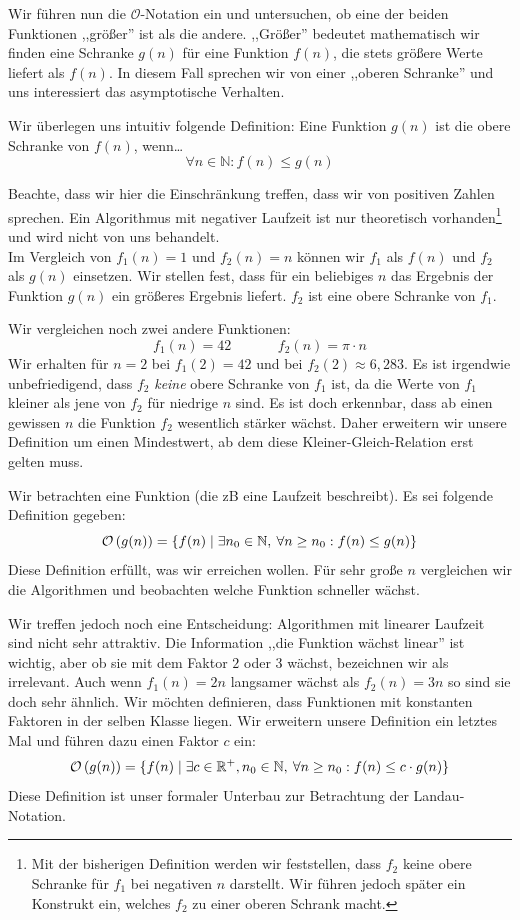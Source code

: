 Wir führen nun die $\mathcal{O}$-Notation ein und untersuchen, ob eine der beiden Funktionen ,,größer'' ist als die andere. ,,Größer'' bedeutet mathematisch wir finden eine Schranke $g(n)$ für eine Funktion $f(n)$, die stets größere Werte liefert als $f(n)$. In diesem Fall sprechen wir von einer ,,oberen Schranke'' und uns interessiert das asymptotische Verhalten.

Wir überlegen uns intuitiv folgende Definition: Eine Funktion $g(n)$ ist die obere Schranke von $f(n)$, wenn\dots
\[
  \forall n \in \mathbb{N}: f(n) \leq g(n)
\]

Beachte, dass wir hier die Einschränkung treffen, dass wir von positiven Zahlen sprechen. Ein Algorithmus mit negativer Laufzeit ist nur theoretisch vorhanden\footnote{Mit der bisherigen Definition werden wir feststellen, dass $f_2$ keine obere Schranke für $f_1$ bei negativen $n$ darstellt. Wir führen jedoch später ein Konstrukt ein, welches $f_2$ zu einer oberen Schrank macht.} und wird nicht von uns behandelt. \\
Im Vergleich von $f_1(n) = 1$ und $f_2(n) = n$ können wir $f_1$ als $f(n)$ und $f_2$ als $g(n)$ einsetzen. Wir stellen fest, dass für ein beliebiges $n$ das Ergebnis der Funktion $g(n)$ ein größeres Ergebnis liefert. $f_2$ ist eine obere Schranke von $f_1$.

Wir vergleichen noch zwei andere Funktionen:
\[
   f_1(n) = 42   \hspace{40pt}  f_2(n) = \pi \cdot n
\]
Wir erhalten für $n = 2$ bei $f_1(2) = 42$ und bei $f_2(2) \approx 6,283$. Es ist irgendwie unbefriedigend, dass $f_2$ \emph{keine} obere Schranke von $f_1$ ist, da die Werte von $f_1$ kleiner als jene von $f_2$ für niedrige $n$ sind. Es ist doch erkennbar, dass ab einen gewissen $n$ die Funktion $f_2$ wesentlich stärker wächst. Daher erweitern wir unsere Definition um einen Mindestwert, ab dem diese Kleiner-Gleich-Relation erst gelten muss.

Wir betrachten eine Funktion (die zB eine Laufzeit beschreibt). Es sei folgende Definition gegeben:
\[
  \mathcal{O}\left(g(n)\right) = \{ f(n) \mid \exists n_0 \in \mathbb{N}, \:\forall n \geq n_0: f(n) \leq g(n) \}
\]
Diese Definition erfüllt, was wir erreichen wollen. Für sehr große $n$ vergleichen wir die Algorithmen und beobachten welche Funktion schneller wächst.

Wir treffen jedoch noch eine Entscheidung: Algorithmen mit linearer Laufzeit sind nicht sehr attraktiv. Die Information ,,die Funktion wächst linear'' ist wichtig, aber ob sie mit dem Faktor $2$ oder $3$ wächst, bezeichnen wir als irrelevant. Auch wenn $f_1(n) = 2n$ langsamer wächst als $f_2(n) = 3n$ so sind sie doch sehr ähnlich. Wir möchten definieren, dass Funktionen mit konstanten Faktoren in der selben Klasse liegen. Wir erweitern unsere Definition ein letztes Mal und führen dazu einen Faktor $c$ ein:
\[
   \mathcal{O}\left(g(n)\right) = \{ f(n) \mid \exists c \in \mathbb{R}^+, n_0 \in \mathbb{N},
                  \:\forall n \geq n_0: f(n) \leq c \cdot g(n) \}
\]
%
Diese Definition ist unser formaler Unterbau zur Betrachtung der Landau-Notation.

